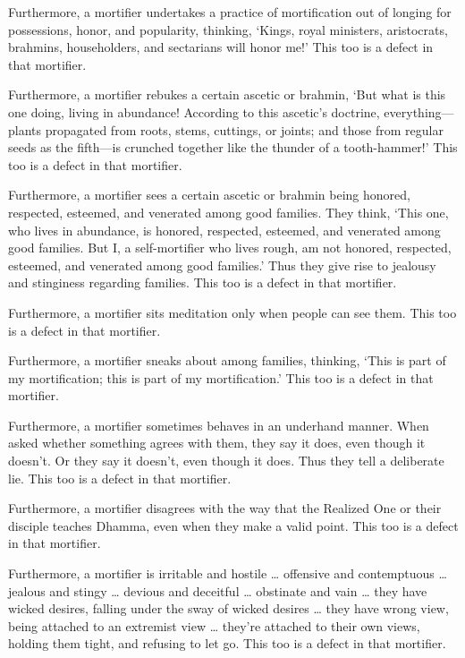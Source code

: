 \documentclass[12pt,openany]{book}%
\begin{document}
Furthermore, a mortifier undertakes a practice of mortification out of longing for possessions, honor, and popularity, thinking, ‘Kings, royal ministers, aristocrats, brahmins, householders, and sectarians will honor me!’ This too is a defect in that mortifier. 

Furthermore, a mortifier rebukes a certain ascetic or brahmin, ‘But what is this one doing, living in abundance! According to this ascetic’s doctrine, everything—plants propagated from roots, stems, cuttings, or joints; and those from regular seeds as the fifth—is crunched together like the thunder of a tooth-hammer!’ This too is a defect in that mortifier. 

Furthermore, a mortifier sees a certain ascetic or brahmin being honored, respected, esteemed, and venerated among good families. They think, ‘This one, who lives in abundance, is honored, respected, esteemed, and venerated among good families. But I, a self-mortifier who lives rough, am not honored, respected, esteemed, and venerated among good families.’ Thus they give rise to jealousy and stinginess regarding families. This too is a defect in that mortifier. 

Furthermore, a mortifier sits meditation only when people can see them. This too is a defect in that mortifier. 

Furthermore, a mortifier sneaks about among families, thinking, ‘This is part of my mortification; this is part of my mortification.’ This too is a defect in that mortifier. 

Furthermore, a mortifier sometimes behaves in an underhand manner. When asked whether something agrees with them, they say it does, even though it doesn’t. Or they say it doesn’t, even though it does. Thus they tell a deliberate lie. This too is a defect in that mortifier. 

Furthermore, a mortifier disagrees with the way that the Realized One or their disciple teaches Dhamma, even when they make a valid point. This too is a defect in that mortifier. 

Furthermore, a mortifier is irritable and hostile … offensive and contemptuous … jealous and stingy … devious and deceitful … obstinate and vain … they have wicked desires, falling under the sway of wicked desires … they have wrong view, being attached to an extremist view … they’re attached to their own views, holding them tight, and refusing to let go. This too is a defect in that mortifier. 
\end{document}

